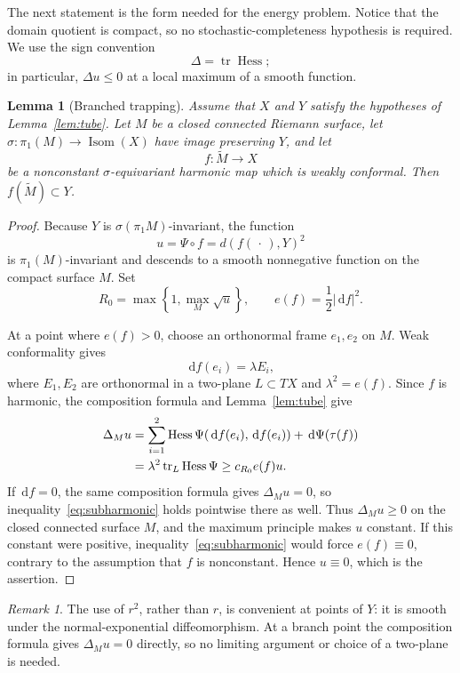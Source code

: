 \documentclass[12pt]{amsart}
\newtheorem{lemma}[theorem]{Lemma}
\theoremstyle{remark}
\newtheorem{remark}[theorem]{Remark}
\newcommand{\tr}{\operatorname{tr}}
\newcommand{\Hess}{\operatorname{Hess}}
\newcommand{\dd}{\,\mathrm d}
\begin{document}
The next statement is the form needed for the energy problem.  Notice that the
domain quotient is compact, so no stochastic-completeness hypothesis is
required.  We use the sign convention
\[
 \Delta=\tr\Hess;
\]
in particular, $\Delta u\le0$ at a local maximum of a smooth function.

\begin{lemma}[Branched trapping]\label{lem:trapping}
Assume that $X$ and $Y$ satisfy the hypotheses of Lemma~\ref{lem:tube}.  Let $M$
be a closed connected Riemann surface, let
$\sigma:\pi_1(M)\to\operatorname{Isom}(X)$ have image preserving $Y$, and let
\[
 f:\widetilde M\longrightarrow X
\]
be a nonconstant $\sigma$-equivariant harmonic map which is weakly conformal.
Then $f(\widetilde M)\subset Y$.
\end{lemma}

\begin{proof}
Because $Y$ is $\sigma(\pi_1M)$-invariant, the function
\[
 u=\Psi\circ f=d(f(\,\cdot\,),Y)^2
\]
is $\pi_1(M)$-invariant and descends to a smooth nonnegative function on the
compact surface $M$.  Set
\[
 R_0=\max\left\{1,\max_M\sqrt{u}\right\},
 \qquad e(f)=\frac12|\dd f|^2.
\]

At a point where $e(f)>0$, choose an orthonormal frame $e_1,e_2$ on $M$.
Weak conformality gives
\[
 \dd f(e_i)=\lambda E_i,
\]
where $E_1,E_2$ are orthonormal in a two-plane $L\subset TX$ and
$\lambda^2=e(f)$.  Since $f$ is harmonic, the composition formula and
Lemma~\ref{lem:tube} give
\begin{align}
 \Delta_Mu
 &=\sum_{i=1}^{2}\Hess\Psi(\dd f(e_i),\dd f(e_i))
   +\dd\Psi(\tau(f))\notag\\
 &=\lambda^2\tr_L\Hess\Psi
 \ge c_{R_0}e(f)u.\label{eq:subharmonic}
\end{align}
If $\dd f=0$, the same composition formula gives $\Delta_Mu=0$, so
inequality~\eqref{eq:subharmonic} holds pointwise there as well.  Thus
$\Delta_Mu\ge0$ on the closed connected surface $M$, and the maximum principle
makes $u$ constant.  If this constant were positive,
inequality~\eqref{eq:subharmonic} would force
$e(f)\equiv0$, contrary to the assumption that $f$ is nonconstant.  Hence
$u\equiv0$, which is the assertion.
\end{proof}

\begin{remark}
The use of $r^2$, rather than $r$, is convenient at points of $Y$: it is smooth
under the normal-exponential diffeomorphism.  At a branch point the composition
formula gives $\Delta_Mu=0$ directly, so no limiting argument or choice of a
two-plane is needed.
\end{remark}
\end{document}
